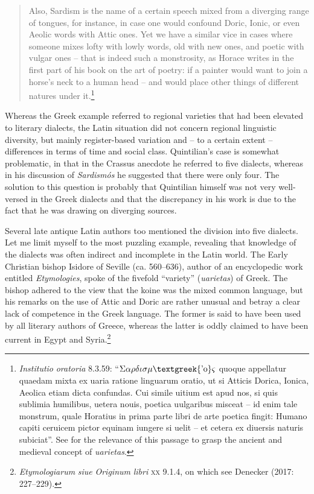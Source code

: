 \begin{quote}
Also, Sardism is the name of a certain speech mixed from a diverging range of tongues, for instance, in case one would confound Doric, Ionic, or even Aeolic words with Attic ones. Yet we have a similar vice in cases where someone mixes lofty with lowly words, old with new ones, and poetic with vulgar ones – that is indeed such a monstrosity, as Horace writes in the first part of his book on the art of poetry: if a painter would want to join a horse’s neck to a human head – and would place other things of different natures under it.\footnote{\textrm{ \textit{Institutio} \textit{oratoria}} \textrm{8.3.59: “$\Sigma \alpha \rho \delta \iota \sigma \mu \text{\textgreek{'o}}\varsigma $ quoque appellatur quaedam mixta ex uaria ratione linguarum oratio, ut si Atticis Dorica, Ionica, Aeolica etiam dicta confundas. Cui simile uitium est apud nos, si quis sublimia humilibus, uetera nouis, poetica uulgaribus misceat – id enim tale monstrum, quale Horatius in prima parte libri de arte poetica fingit: Humano capiti ceruicem pictor equinam iungere si uelit – et cetera ex diuersis naturis subiciat”. See \citet[46]{Carruthers2009} for the relevance of this passage to grasp the ancient and medieval concept of} \textrm{\textit{uarietas}}.}
\end{quote}

Whereas the Greek example referred to regional varieties that had been elevated to literary dialects, the Latin situation did not concern regional linguistic diversity, but mainly register-based variation and – to a certain extent – differences in terms of time and social class. Quintilian’s case is somewhat problematic, in that in the Crassus anecdote he referred to five dialects, whereas in his discussion of \textit{Sardismós} he suggested that there were only four. The solution to this question is probably that Quintilian himself was not very well-versed in the Greek dialects and that the discrepancy in his work is due to the fact that he was drawing on diverging sources.

Several late antique Latin authors too mentioned the division into five dialects. Let me limit myself to the most puzzling example, revealing that knowledge of the dialects was often indirect and incomplete in the Latin world. The Early Christian bishop Isidore of Seville (ca. 560–636), author of an encyclopedic work entitled \textit{Etymologies}, spoke of the fivefold “variety” (\textit{uarietas}) of Greek. The bishop adhered to the view that the koine was the mixed common language, but his remarks on the use of Attic and Doric are rather unusual and betray a clear lack of competence in the Greek language. The former is said to have been used by all literary authors of Greece, whereas the latter is oddly claimed to have been current in Egypt and Syria.\footnote{\textit{Etymologiarum} \textit{siue} \textit{Originum} \textit{libri} \textsc{xx} 9.1.4, on which see Denecker (2017: 227–229).}

